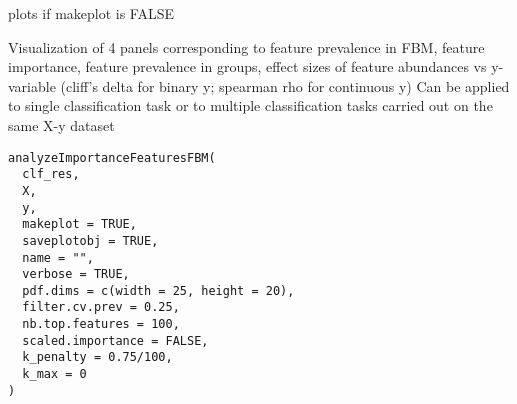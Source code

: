 \documentclass[a4paper]{book}
\begin{document}
%
\begin{Value}
plots if makeplot is FALSE
\end{Value}
%
\begin{Description}
Visualization of 4 panels corresponding to feature prevalence in FBM, feature importance, feature prevalence in groups, effect sizes of feature abundances vs y-variable (cliff's delta for binary y; spearman rho for continuous y)
Can be applied to single classification task or to multiple classification tasks carried out on the same X-y dataset
\end{Description}
%
\begin{Usage}
\begin{verbatim}
analyzeImportanceFeaturesFBM(
  clf_res,
  X,
  y,
  makeplot = TRUE,
  saveplotobj = TRUE,
  name = "",
  verbose = TRUE,
  pdf.dims = c(width = 25, height = 20),
  filter.cv.prev = 0.25,
  nb.top.features = 100,
  scaled.importance = FALSE,
  k_penalty = 0.75/100,
  k_max = 0
)
\end{verbatim}
\end{Usage}
%
\end{document}
